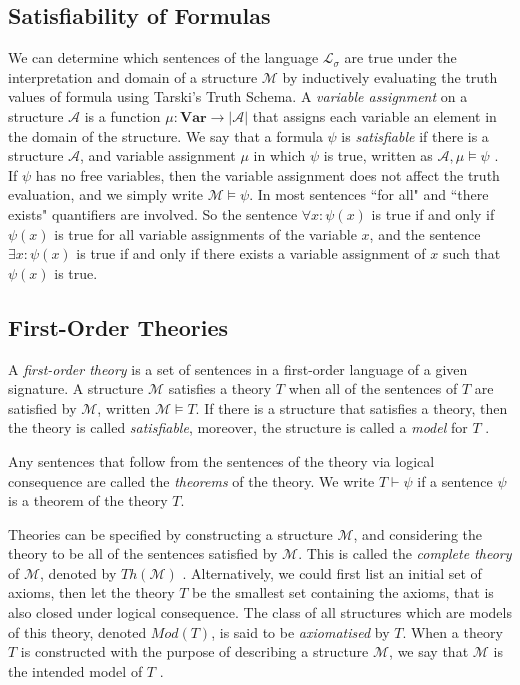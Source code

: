 \documentclass[11pt]{report}
\theoremstyle{definition}
\theoremstyle{theorem}
\theoremstyle{lemma}
\begin{document}
\subsection{Satisfiability of Formulas}
We can determine which sentences of the language $\mathcal{L_\sigma}$ are true under the interpretation and domain of a structure $\mathcal{M}$ by inductively evaluating the truth values of formula using Tarski's Truth Schema\cite{tarski}.
A \emph{variable assignment} on a structure $\mathcal{A}$ is a function $\mu: \textbf{Var} \rightarrow |\mathcal{A}|$ that assigns each variable an element in the domain of the structure.
We say that a formula $\psi$ is \emph{satisfiable} if there is a structure $\mathcal A$, and variable assignment $\mu$ in which $\psi$ is true, written as $\mathcal{A}, \mu \vDash \psi$ \cite[ch.~2.3]{selinger}.\\

\noindent
If $\psi$ has no free variables, then the variable assignment does not affect the truth evaluation, and we simply write $\mathcal{M} \vDash \psi$.
In most sentences ``for all" and ``there exists" quantifiers are involved.
So the sentence $\forall x: \psi(x)$ is true if and only if $\psi(x)$ is true for all variable assignments of the variable $x$, and the sentence $\exists x: \psi(x)$ is true if and only if there exists a variable assignment of $x$ such that $\psi(x)$ is true.

\subsection{First-Order Theories}
A \emph{first-order theory} is a set of sentences in a first-order language of a given signature.
A structure $\mathcal M$ satisfies a theory $T$ when all of the sentences of $T$ are satisfied by $\mathcal{M}$, written $\mathcal{M} \vDash T$. If there is a structure that satisfies a theory, then the theory is called \emph{satisfiable}, moreover, the structure is called a \emph{model} for $T$ \cite[ch.~2.5]{selinger}.

Any sentences that follow from the sentences of the theory via logical consequence are called the \emph{theorems} of the theory. We write $T\vdash \psi$ if a sentence $\psi$ is a theorem of the theory $T$.

Theories can be specified by constructing a structure $\mathcal{M}$, and considering the theory to be all of the sentences satisfied by $\mathcal{M}$. This is called the \emph{complete theory} of $\mathcal{M}$, denoted by $\mathit{Th}(\mathcal{M})$ \cite[ch.~1]{stanmodel}.
Alternatively, we could first list an initial set of axioms, then let the theory $T$ be the smallest set containing the axioms, that is also closed under logical consequence. The class of all structures which are models of this theory, denoted $\mathit{Mod(T)}$, is said to be \emph{axiomatised} by $T$.
When a theory $T$ is constructed with the purpose of describing a structure $\mathcal{M}$, we say that $\mathcal{M}$ is the intended model of $T$ \cite[ch.~2.2]{shortermodel}.
\end{document}
